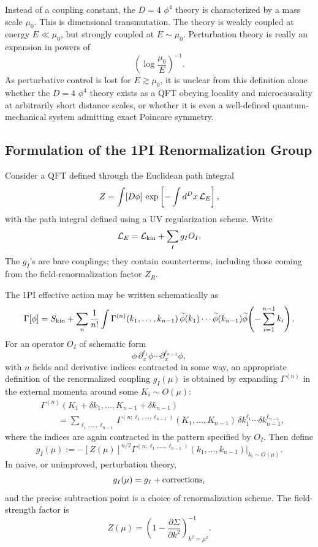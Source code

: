 Instead of a coupling constant, the \(D=4\) \(\phi^4\) theory is characterized
by a mass scale \(\mu_0\).  This is dimensional transmutation.  The theory is
weakly coupled at energy \(E\ll\mu_0\), but strongly coupled at
\(E\sim\mu_0\).  Perturbation theory is really an expansion in powers of
\[
  \left(\log\frac{\mu_0}{E}\right)^{-1}.
\]
As perturbative control is lost for \(E\gtrsim\mu_0\), it is unclear from
this definition alone whether the \(D=4\) \(\phi^4\) theory exists as a QFT
obeying locality and microcausality at arbitrarily short distance scales, or
whether it is even a well-defined quantum-mechanical system admitting exact
Poincare symmetry.

\subsection{Formulation of the 1PI Renormalization Group}

Consider a QFT defined through the Euclidean path integral
\[
  Z=\int[D\phi]\,\exp\left[-\int d^Dx\,{\cal L}_E\right],
\]
with the path integral defined using a UV regularization scheme.  Write
\[
  {\cal L}_E={\cal L}_{\rm kin}+\sum_I g_I O_I .
\]
The \(g_I\)'s are bare couplings; they contain counterterms, including those
coming from the field-renormalization factor \(Z_R\).

The 1PI effective action may be written schematically as
\[
  \Gamma[\phi]
  =
  S_{\rm kin}
  +\sum_n\frac{1}{n!}
  \int
  \Gamma^{(n)}(k_1,\ldots,k_{n-1})\,
  \widetilde\phi(k_1)\cdots
  \widetilde\phi(k_{n-1})
  \widetilde\phi\!\left(-\sum_{i=1}^{n-1}k_i\right).
\]
For an operator \(O_I\) of schematic form
\[
  \phi\,\partial_x^{\ell_1}\phi\cdots
  \partial_x^{\ell_{n-1}}\phi,
\]
with \(n\) fields and derivative indices contracted in some way, an
appropriate definition of the renormalized coupling \(g_I(\mu)\) is obtained
by expanding \(\Gamma^{(n)}\) in the external momenta around some
\(K_i\sim O(\mu)\):
\[
\begin{split}
  &\Gamma^{(n)}
  (K_1+\delta k_1,\ldots,K_{n-1}+\delta k_{n-1})
\\
  &\qquad
  =
  \sum_{\ell_1,\ldots,\ell_{n-1}}
  \Gamma^{(n;\ell_1,\ldots,\ell_{n-1})}
  (K_1,\ldots,K_{n-1})\,
  \delta k_1^{\ell_1}\cdots
  \delta k_{n-1}^{\ell_{n-1}},
\end{split}
\]
where the indices are again contracted in the pattern specified by \(O_I\).
Then define
\[
  g_I(\mu)
  :=
  -
  \left[Z(\mu)\right]^{n/2}
  \Gamma^{(n;\ell_1,\ldots,\ell_{n-1})}
  (k_1,\ldots,k_{n-1})
  \bigg|_{k_i\sim O(\mu)} .
\]
In naive, or unimproved, perturbation theory,
\[
  g_I(\mu)=g_I+\hbox{corrections},
\]
and the precise subtraction point is a choice of renormalization scheme.  The
field-strength factor is
\[
  Z(\mu)
  =
  \left(
    1-\frac{\partial\Sigma}{\partial k^2}
  \right)^{-1}_{k^2=\mu^2}.
\]


